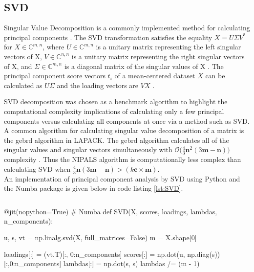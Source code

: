 \documentclass[12pt]{article}
\begin{document}
\subsection{SVD}\label{3.2}
Singular Value Decomposition is a commonly implemented method for calculating principal components \cite{oliphant2009numpy} \cite{scikit-learn}. The SVD transformation satisfies the equality $X=U \Sigma V^*$ for $X \in \mathbb{C}^{m,n}$, where
$ U\in \mathbb{C}^{m,n}$ is a unitary matrix representing the left singular vectors of X, $ V\in \mathbb{C}^{n,n}$ is a unitary matrix representing the right singular vectors of X, and $\Sigma \in \mathbb{C}^{m,n}$ is a diagonal matrix of the singular values of X \cite{trefethen1997numerical}. The principal component score vectors $t_i$ of a mean-centered dataset $X$ can be calculated as $U \Sigma $ and the loading vectors are $VX$ \cite{madsen2004singular}.

SVD decomposition was chosen as a benchmark algorithm to highlight the computational complexity implications of calculating only a few principal components versus calculating all components at once via a method such as SVD. A common algorithm for calculating singular value decomposition of a matrix is the gebrd algorithm in LAPACK. The gebrd algorithm calculates all of the singular values and singular vectors simultaneously with $\mathcal{O}\big( \frac{4}{3}\textbf{n}^2(3\textbf{m} - \textbf{n}) \big)$ complexity \cite{intelmath}. Thus the NIPALS algorithm is computationally less complex than calculating SVD when $\frac{4}{3}\textbf{n}(3\textbf{m} - \textbf{n})>(k\textbf{c}\times\textbf{m})$.  \\ An implementation of principal component analysis by SVD using Python and the Numba package \cite{numba} is given below in code listing \ref{lst:SVD}.

\begin{lstlisting}[frame=none,caption={Calculating Principal Components with SVD},captionpos=b,label=lst:SVD]
\end{lstlisting}

\begin{python}
@jit(nopython=True) # Numba
def SVD(X, scores, loadings, lambdas, n_components):

    u, s, vt = np.linalg.svd(X, full_matrices=False)
    m = X.shape[0]

    loadings[:] = (vt.T)[:, 0:n_components]
    scores[:] = np.dot(u, np.diag(s))[:,0:n_components]
    lambdas[:] = np.dot(s, s)
    lambdas /= (m - 1)
\end{python}
\end{document}
